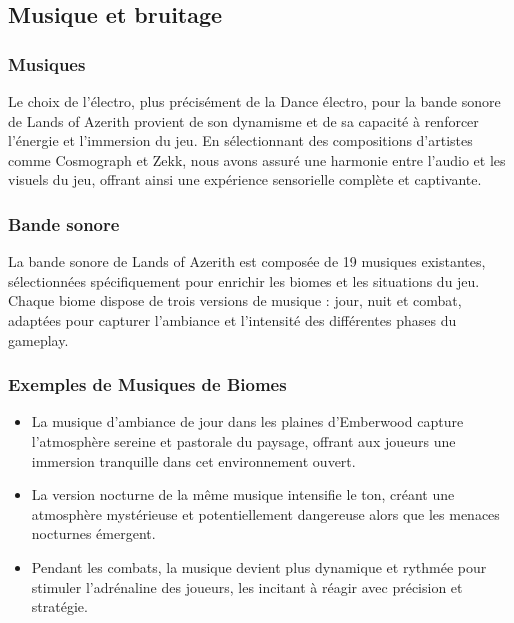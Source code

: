 \subsection{Musique et bruitage}

\subsubsection{Musiques}

Le choix de l'électro, plus précisément de la Dance électro, pour la bande sonore de Lands of Azerith provient de son dynamisme et de sa capacité à renforcer l'énergie et l'immersion du jeu. 
En sélectionnant des compositions d'artistes comme Cosmograph et Zekk, nous avons assuré une harmonie entre l'audio et les visuels du jeu, offrant ainsi une expérience sensorielle complète et captivante.

\subsubsection{Bande sonore}

La bande sonore de Lands of Azerith est composée de 19 musiques existantes, sélectionnées spécifiquement pour enrichir les biomes et les situations du jeu. 
\\

Chaque biome dispose de trois versions de musique : jour, nuit et combat, adaptées pour capturer l'ambiance et l'intensité des différentes phases du gameplay.

\subsubsection{Exemples de Musiques de Biomes}

\begin{itemize}
    \item La musique d'ambiance de jour dans les plaines d'Emberwood capture l'atmosphère sereine et pastorale du paysage, offrant aux joueurs une immersion tranquille dans cet environnement ouvert.
    \\

    \item La version nocturne de la même musique intensifie le ton, créant une atmosphère mystérieuse et potentiellement dangereuse alors que les menaces nocturnes émergent.
    \\

    \item Pendant les combats, la musique devient plus dynamique et rythmée pour stimuler l'adrénaline des joueurs, les incitant à réagir avec précision et stratégie.
\end{itemize}

